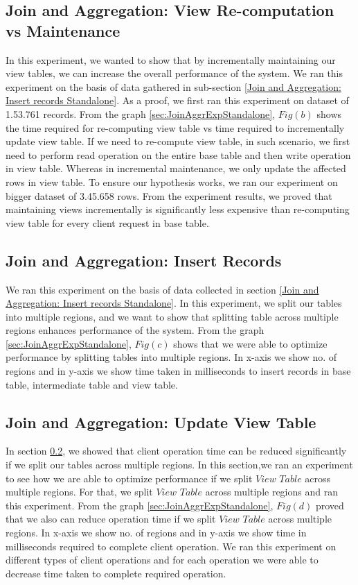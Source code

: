\documentclass[11pt,a4paper,bibtotoc,idxtotoc,headsepline,footsepline,footexclude,BCOR12mm,DIV13]{scrbook}
\begin{document}
\subsection{Join and Aggregation: View Re-computation vs Maintenance}
\label{Join and Aggregation: View Re-computation vs Maintenance Standalone}
In this experiment, we wanted to show that by incrementally maintaining our view tables, we can increase the overall performance of the system. We ran this experiment on the basis of data gathered in sub-section \ref{Join and Aggregation: Insert records Standalone}. As a proof, we first ran this experiment on dataset of 1.53.761 records. From the graph \ref{sec:JoinAggrExpStandalone}, $Fig(b)$ shows the time required for re-computing view table vs time required to incrementally update view table. If we need to re-compute view table, in such scenario, we first need to perform read operation on the entire base table and then write operation in view table. Whereas in incremental maintenance, we only update the affected rows in view table. To ensure our hypothesis works, we ran our experiment on bigger dataset of 3.45.658 rows. From the experiment results, we proved that maintaining views incrementally is significantly less expensive than re-computing view table for every client request in base table.

\subsection{Join and Aggregation: Insert Records}
\label{Join and Aggregation: Insert Records Standalone}
We ran this experiment on the basis of data collected in section \ref{Join and Aggregation: Insert records Standalone}. In this experiment, we split our tables into multiple regions, and we want to show that splitting table across multiple regions enhances performance of the system. From the graph \ref{sec:JoinAggrExpStandalone}, $Fig(c)$ shows that we were able to optimize performance by splitting tables into multiple regions. In x-axis we show no. of regions and in y-axis we show time taken in milliseconds to insert records in base table, intermediate table and view table.

\subsection{Join and Aggregation: Update View Table} 
\label{Join and Aggr: Update View Table Standalone}
In section \ref{Join and Aggregation: Insert Records Standalone}, we showed that client operation time can be reduced significantly if we split our tables across multiple regions. In this section,we ran an experiment to see how we are able to optimize performance if we split $View$ $Table$ across multiple regions. For that, we split $View$ $Table$ across multiple regions and ran this experiment. From the graph \ref{sec:JoinAggrExpStandalone}, $Fig(d)$ proved that we also can reduce operation time if we split $View$ $Table$ across multiple regions. In x-axis we show no. of regions and in y-axis we show time in milliseconds required to complete client operation. We ran this experiment on different types of client operations and for each operation we were able to decrease time taken to complete required operation. 
\end{document}
